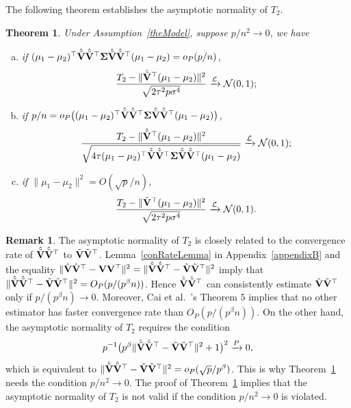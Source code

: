 \documentclass[times,sort&compress,3p]{elsarticle}
\theoremstyle{plain}
\newtheorem{theorem}{\quad\quad Theorem}
\theoremstyle{definition}
\newtheorem{remark}{\quad\quad Remark}
\theoremstyle{remark}
\begin{document}
The following theorem establishes the asymptotic normality of $T_2$.
\begin{theorem}\label{myPanpan}
    Under Assumption~\ref{theModel},
suppose $p/n^2\to 0$,
    we have
    \begin{enumerate}[(a)]
        \item
 if $(\mu_1-\mu_2)^\top  \hat{\tilde{\mathbf{V}}}\hat{\tilde{\mathbf{V}}}^\top  \boldsymbol{\Sigma}\hat{\tilde{\mathbf{V}}}\hat{\tilde{\mathbf{V}}}^\top  (\mu_1-\mu_2)=o_P(p/n)$,
\begin{equation*}
    \frac{T_2-\|\hat{\tilde{\mathbf{V}}}^\top (\mu_1-\mu_2)\|^2}{\sqrt{2\tau^2 p\sigma^4}}\xrightarrow{\mathcal{L}}\mathcal{N}(0,1);
\end{equation*}
        \item
 if $p/n=o_P\big((\mu_1-\mu_2)^\top  \hat{\tilde{\mathbf{V}}}\hat{\tilde{\mathbf{V}}}^\top  \boldsymbol{\Sigma}\hat{\tilde{\mathbf{V}}}\hat{\tilde{\mathbf{V}}}^\top  (\mu_1-\mu_2)\big)$,
\begin{equation*}
    \frac{T_2-\|\hat{\tilde{\mathbf{V}}}^\top (\mu_1-\mu_2)\|^2}{\sqrt{4\tau (\mu_1-\mu_2)^\top  \hat{\tilde{\mathbf{V}}}\hat{\tilde{\mathbf{V}}}^\top  \boldsymbol{\Sigma}\hat{\tilde{\mathbf{V}}}\hat{\tilde{\mathbf{V}}}^\top  (\mu_1-\mu_2)}}\xrightarrow{\mathcal{L}}\mathcal{N}(0,1);
\end{equation*}
        \item
 if $\|\mu_1-\mu_2\|^2=O({\sqrt{p}}/{n})$,
\begin{equation*}
    \frac{T_2-\|\tilde{\mathbf{V}}^\top (\mu_1-\mu_2)\|^2}{\sqrt{2\tau^2 p\sigma^4}}\xrightarrow{\mathcal{L}}\mathcal{N}(0,1).
\end{equation*}
    \end{enumerate}
\end{theorem} 
\begin{remark}
The asymptotic normality of $T_2$ is closely related to the convergence rate of $\hat{\tilde{\mathbf{V}}}\hat{\tilde{\mathbf{V}}}^\top $ to $\tilde{\mathbf{V}}\tilde{\mathbf{V}}^\top $.
    Lemma~\ref{conRateLemma} in Appendix~\ref{appendixB} and the equality $\|\hat{\mathbf{V}}\hat{\mathbf{V}}^\top  -\mathbf{V} \mathbf{V}^\top \|^2=\|\hat{\tilde{\mathbf{V}}}\hat{\tilde{\mathbf{V}}}^\top  -\tilde{\mathbf{V}} \tilde{\mathbf{V}}^\top \|^2$ imply that 
    $\|\hat{\tilde{\mathbf{V}}}\hat{\tilde{\mathbf{V}}}^\top  -\tilde{\mathbf{V}} \tilde{\mathbf{V}}^\top \|^2=O_P(p/(p^{\beta}n))$.
    Hence $\hat{\tilde{\mathbf{V}}}\hat{\tilde{\mathbf{V}}}^\top $ can consistently estimate $\tilde{\mathbf{V}}\tilde{\mathbf{V}}^\top $ only if $p/(p^{\beta}n)\to 0$.
    Moreover, Cai {\rm et al.}~\cite{Cai2012Sparse}'s Theorem $5$ implies that no other estimator has faster convergence rate than $O_P(p/(p^{\beta}n))$.
    On the other hand, the asymptotic normality of $T_2$ requires the condition
    $$
    p^{-1}\big(p^{\beta}\|\hat{\tilde{\mathbf{V}}}\hat{\tilde{\mathbf{V}}}^\top  -\tilde{\mathbf{V}} \tilde{\mathbf{V}}^\top \|^2+1\big)^2\xrightarrow{P} 0,
    $$
    which is equivalent to $\|\hat{\tilde{\mathbf{V}}}\hat{\tilde{\mathbf{V}}}^\top  -\tilde{\mathbf{V}} \tilde{\mathbf{V}}^\top \|^2=o_P(\sqrt{p}/p^{\beta})$.
    This is why Theorem~\ref{myPanpan} needs the condition  $p/n^2\to 0$.
The proof of Theorem~\ref{myPanpan} implies that the asymptotic normality of $T_2$ is not valid if the condition $p/n^2\to 0$ is violated.
\end{remark}
\end{document}
